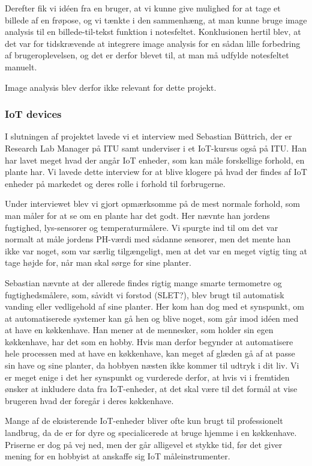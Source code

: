 Derefter fik vi idéen fra en bruger, at vi kunne give mulighed for at tage et billede af en frøpose, og vi tænkte i den sammenhæng, at man kunne bruge image analysis til en billede-til-tekst funktion i notesfeltet. Konklusionen hertil blev, at det var for tidskrævende at integrere image analysis for en sådan lille forbedring af brugeroplevelsen, og det er derfor blevet til, at man må udfylde notesfeltet manuelt. 

Image analysis blev derfor ikke relevant for dette projekt.

\subsubsection{IoT devices}
I slutningen af projektet lavede vi et interview med Sebastian Büttrich, der er Research Lab Manager på ITU samt underviser i et IoT-kursus også på ITU. Han har lavet meget hvad der angår IoT enheder, som kan måle forskellige forhold, en plante har. Vi lavede dette interview for at blive klogere på hvad der findes af IoT enheder på markedet og deres rolle i forhold til forbrugerne.

Under interviewet blev vi gjort opmærksomme på de mest normale forhold, som man måler for at se om en plante har det godt. Her nævnte han jordens fugtighed, lys-sensorer og temperaturmålere. Vi spurgte ind til om det var normalt at måle jordens PH-værdi med sådanne sensorer, men det mente han ikke var noget, som var særlig tilgængeligt, men at det var en meget vigtig ting at tage højde for, når man skal sørge for sine planter.

Sebastian nævnte at der allerede findes rigtig mange smarte termometre og fugtighedsmålere, som, såvidt vi forstod (SLET?), blev brugt til automatisk vanding eller vedligehold af sine planter. Her kom han dog med et synspunkt, om at automatiserede systemer kan gå hen og blive noget, som går imod idéen med at have en køkkenhave. Han mener at de mennesker, som holder sin egen køkkenhave, har det som en hobby. Hvis man derfor begynder at automatisere hele processen med at have en køkkenhave, kan meget af glæden gå af at passe sin have og sine planter, da hobbyen næsten ikke kommer til udtryk i dit liv. Vi er meget enige i det her synspunkt og vurderede derfor, at hvis vi i fremtiden ønsker at inkludere data fra IoT-enheder, at det skal være til det formål at vise brugeren hvad der foregår i deres køkkenhave.

Mange af de eksisterende IoT-enheder bliver ofte kun brugt til professionelt landbrug, da de er for dyre og specialicerede at bruge hjemme i en køkkenhave. Priserne er dog på vej ned, men der går alligevel et stykke tid, før det giver mening for en hobbyist at anskaffe sig IoT måleinstrumenter.

